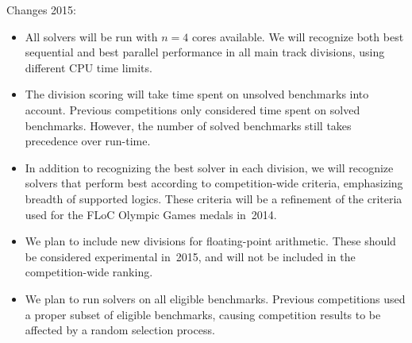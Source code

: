 \documentclass[twoside,11pt]{article}
\begin{document}

\begin{tjark}
Changes 2015:
\begin{itemize}
\item All solvers will be run with $n=4$ cores available.  We will
  recognize both best sequential and best parallel performance in all
  main track divisions, using different CPU time limits.
\item The division scoring will take time spent on unsolved benchmarks
  into account.  Previous competitions only considered time spent on
  solved benchmarks.  However, the number of solved benchmarks still
  takes precedence over run-time.
\item In addition to recognizing the best solver in each division, we
  will recognize solvers that perform best according to
  competition-wide criteria, emphasizing breadth of supported logics.
  These criteria will be a refinement of the criteria used for the
  FLoC Olympic Games medals in~2014.
\item We plan to include new divisions for floating-point arithmetic.
  These should be considered experimental in~2015, and will not be
  included in the competition-wide ranking.
\item We plan to run solvers on all eligible benchmarks.  Previous
  competitions used a proper subset of eligible benchmarks, causing
  competition results to be affected by a random selection process.
\end{itemize}


\end{tjark}
\end{document}
